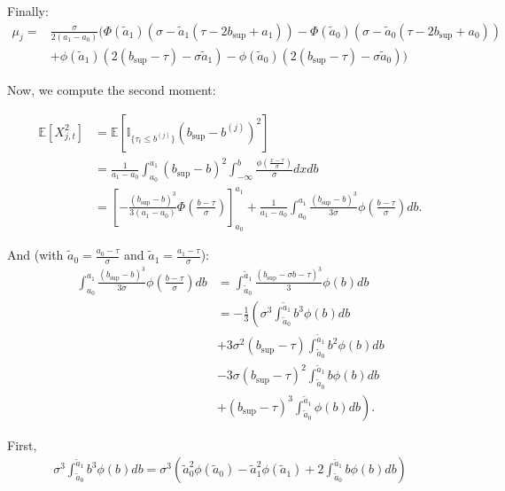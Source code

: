 \documentclass[11pt]{article}
\begin{document}
Finally:
\begin{align*}
  \mu_j = &\frac{\sigma}{2(a_1 - a_0)}\biggl( \Phi\left(\tilde{a}_1\right) \left( \sigma - \tilde{a}_1\left(\tau - 2 b_{\sup} + a_1 \right)\right) - \Phi\left(\tilde{a}_0\right) \left( \sigma - \tilde{a}_0 \left(\tau - 2 b_{\sup} + a_0 \right)\right)\\
        &+ \phi\left(\tilde{a}_1\right)\left(  2 ( b_{\sup} - \tau)-\sigma \tilde{a}_1\right) - \phi\left(\tilde{a}_0\right)\left(  2 ( b_{\sup} - \tau)- \sigma \tilde{a}_0\right)\biggr)
\end{align*}

\bigskip

Now, we compute the second moment:

\begin{align*}
  \mathbb{E}[X_{j,t}^2] &= \mathbb{E}[\mathbb{I}_{\{\tau_t \leq b^{(j)}\}}(b_{\sup}-b^{(j)})^2] \\
  & = \frac{1}{a_1 - a_0}\int_{a_0}^{a_1} (b_{\sup}-b)^2 \int_{-\infty}^{b} \frac{\phi\left(\frac{x - \tau}{\sigma}\right)}{\sigma} dx db \\
  & = \left[- \frac{(b_{\sup}-b)^3}{3 (a_1 - a_0)} \Phi\left(\frac{b - \tau}{\sigma}\right) \right]_{a_0}^{a_1} + \frac{1}{a_1 - a_0}\int_{a_0}^{a_1}  \frac{(b_{\sup}-b)^3}{3 \sigma} \phi\left(\frac{b - \tau}{\sigma}\right)db.
\end{align*}

And (with $\tilde{a}_0 = \frac{a_{0} - \tau}{\sigma} $ and $\tilde{a}_1 = \frac{a_{1} - \tau}{\sigma}$):
\begin{align*}
  \int_{a_0}^{a_1}  \frac{(b_{\sup}-b)^3}{3 \sigma} \phi\left(\frac{b - \tau}{\sigma}\right)db & = \int_{\tilde{a}_0}^{\tilde{a}_1}  \frac{(b_{\sup}- \sigma b - \tau)^3}{3} \phi\left(b\right)db \\
  & = - \frac{1}{3}\left(\sigma^3\int_{\tilde{a}_0}^{\tilde{a}_1} b^3 \phi\left(b\right)db\right. \\
  & + 3 \sigma^2 (b_{\sup}- \tau)\int_{\tilde{a}_0}^{\tilde{a}_1} b^2 \phi\left(b\right)db \\
  & - 3 \sigma (b_{\sup}- \tau)^2\int_{\tilde{a}_0}^{\tilde{a}_1} b \phi\left(b\right)db \\
  & + \left.(b_{\sup}- \tau)^3 \int_{\tilde{a}_0}^{\tilde{a}_1} \phi\left(b\right)db \right).
\end{align*}

First,
\begin{align*}
  \sigma^3\int_{\tilde{a}_0}^{\tilde{a}_1} b^3 \phi\left(b\right)db = \sigma^3 \left( \tilde{a}_0^2 \phi(\tilde{a}_0) -\tilde{a}_1^2 \phi(\tilde{a}_1) + 2 \int_{\tilde{a}_0}^{\tilde{a}_1} b \phi(b) db\right)
\end{align*}
\end{document}
